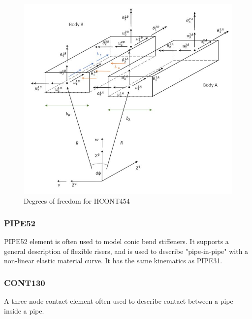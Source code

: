 \begin{figure}[H]
\centering
\includegraphics[scale=0.8]{figures/hcont454}
\caption[$\; \:$HCONT454]{Degrees of freedom for HCONT454 \cite{Bflextheory2017} }
 \label{fig:HCONT454}
\end{figure}

\subsubsection{PIPE52}
PIPE52 element is often used to model conic bend stiffeners. It supports a general description of flexible risers, and is used to describe "pipe-in-pipe" with a non-linear elastic material curve. It has the same kinematics as PIPE31. 

\subsubsection{CONT130}
A three-node contact element often used to describe contact between a pipe inside a pipe. 








